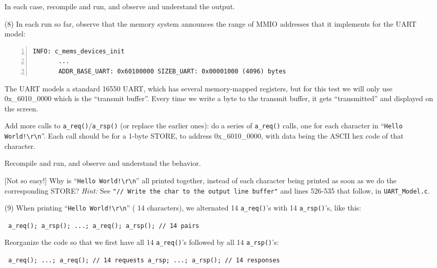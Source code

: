 \begin{itemize}
    In each case, recompile and run, and observe and understand the output.

\item[(8)] In each run so far, observe that the memory system
    announces the range of MMIO addresses that it implements for the
    UART model:

    {\footnotesize
    \begin{Verbatim}[frame=single, numbers=left]
    INFO: c_mems_devices_init
       ...
       ADDR_BASE_UART: 0x60100000 SIZEB_UART: 0x00001000 (4096) bytes
    \end{Verbatim}
    }


    The UART models a standard 16550 UART, which has several
    memory-mapped registers, but for this test we will only use
    0x\_6010\_0000 which is the ``transmit buffer''.  Every time we
    write a byte to the transmit buffer, it gets ``transmitted'' and
    displayed on the screen.

    Add more calls to \verb|a_req()|/\verb|a_rsp()| (or replace the
    earlier ones): do a series of \verb|a_req()| calls, one for each
    character in ``\verb|Hello World!\r\n|''.  Each call should be for
    a 1-byte STORE, to address 0x\_6010\_0000, with data being the
    ASCII hex code of that character.

    Recompile and run, and observe and understand the behavior.

    [Not so easy!] Why is ``\verb|Hello World!\r\n|'' all printed
    together, instead of each character being printed as soon as we do
    the corresponding STORE?  \emph{Hint:} See {\tt "// Write the
    char to the output line buffer"} and lines 526-535 that follow, in
    \verb|UART_Model.c|.

\item[(9)] When printing ``\verb|Hello World!\r\n|'' ({\ie} 14
    characters), we alternated 14 \verb|a_req()|'s with 14
    \verb|a_rsp()|'s, like this:

    \begin{tabbing}\footnotesize\tt
    a\_req(); a\_rsp(); ...; a\_req(); a\_rsp();    // 14 pairs
    \end{tabbing}

    Reorganize the code so that we first have all 14 \verb|a_req()|'s
    followed by all 14 \verb|a_rsp()|'s:

    \begin{tabbing}\footnotesize\tt
    a\_req(); ...; a\_req();    // 14 requests
    a\_rsp; ...; a\_rsp();      // 14 responses
    \end{tabbing}


\end{itemize}
